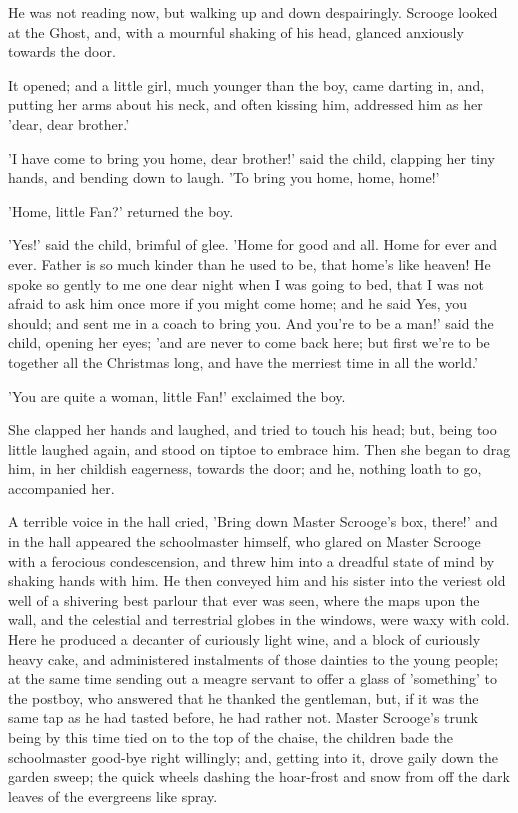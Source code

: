 He was not reading now, but walking up and down despairingly. Scrooge
looked at the Ghost, and, with a mournful shaking of his head, glanced
anxiously towards the door.

It opened; and a little girl, much younger than the boy, came darting
in, and, putting her arms about his neck, and often kissing him,
addressed him as her 'dear, dear brother.'

'I have come to bring you home, dear brother!' said the child, clapping
her tiny hands, and bending down to laugh. 'To bring you home, home,
home!'

'Home, little Fan?' returned the boy.

'Yes!' said the child, brimful of glee. 'Home for good and all. Home for
ever and ever. Father is so much kinder than he used to be, that home's
like heaven! He spoke so gently to me one dear night when I was going to
bed, that I was not afraid to ask him once more if you might come home;
and he said Yes, you should; and sent me in a coach to bring you. And
you're to be a man!' said the child, opening her eyes; 'and are never to
come back here; but first we're to be together all the Christmas long,
and have the merriest time in all the world.'

'You are quite a woman, little Fan!' exclaimed the boy.

She clapped her hands and laughed, and tried to touch his head; but,
being too little laughed again, and stood on tiptoe to embrace him. Then
she began to drag him, in her childish eagerness, towards the door; and
he, nothing loath to go, accompanied her.

A terrible voice in the hall cried, 'Bring down Master Scrooge's box,
there!' and in the hall appeared the schoolmaster himself, who glared on
Master Scrooge with a ferocious condescension, and threw him into a
dreadful state of mind by shaking hands with him. He then conveyed him
and his sister into the veriest old well of a shivering best parlour
that ever was seen, where the maps upon the wall, and the celestial and
terrestrial globes in the windows, were waxy with cold. Here he produced
a decanter of curiously light wine, and a block of curiously heavy cake,
and administered instalments of those dainties to the young people; at
the same time sending out a meagre servant to offer a glass of
'something' to the postboy, who answered that he thanked the gentleman,
but, if it was the same tap as he had tasted before, he had rather not.
Master Scrooge's trunk being by this time tied on to the top of the
chaise, the children bade the schoolmaster good-bye right willingly;
and, getting into it, drove gaily down the garden sweep; the quick
wheels dashing the hoar-frost and snow from off the dark leaves of the
evergreens like spray.

